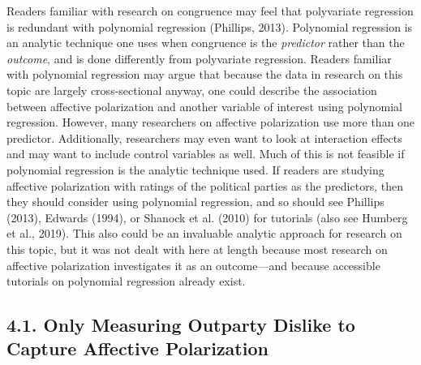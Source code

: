 \documentclass[authordate, meta]{jote-new-article}
\begin{document}
	Readers familiar with research on congruence may feel that polyvariate regression is redundant with polynomial regression (Phillips, 2013). Polynomial regression is an analytic technique one uses when congruence is the \emph{predictor} rather than the \emph{outcome}, and is done differently from polyvariate regression. Readers familiar with polynomial regression may argue that because the data in research on this topic are largely cross-sectional anyway, one could describe the association between affective polarization and another variable of interest using polynomial regression. However, many researchers on affective polarization use more than one predictor. Additionally, researchers may even want to look at interaction effects and may want to include control variables as well. Much of this is not feasible if polynomial regression is the analytic technique used. If readers are studying affective polarization with ratings of the political parties as the predictors, then they should consider using polynomial regression, and so should see Phillips (2013), Edwards (1994), or Shanock et al. (2010) for tutorials (also see Humberg et al., 2019). This also could be an invaluable analytic approach for research on this topic, but it was not dealt with here at length because most research on affective polarization investigates it as an outcome—and because accessible tutorials on polynomial regression already exist.



	\subsection{4.1. Only Measuring Outparty Dislike to Capture Affective Polarization}
\end{document}
